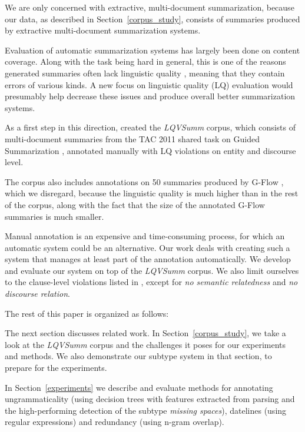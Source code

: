 \documentclass[a4paper,10pt]{scrartcl}
\theoremstyle{style}
\begin{document}
We are only concerned with extractive, multi-document summarization, because our data, as described in Section~\ref{corpus_study}, consists of summaries produced by extractive multi-document summarization systems.

Evaluation of automatic summarization systems has largely been done on content coverage. Along with the task being hard in general, this is one of the reasons generated summaries often lack linguistic quality \citep{nenkova2011foundations}, meaning that they contain errors of various kinds. A new focus on linguistic quality (LQ) evaluation would presumably help decrease these issues and produce overall better summarization systems.

As a first step in this direction, \cite{friedrichlqvsumm} created the \textit{LQVSumm} corpus, which consists of multi-document summaries from the TAC 2011 shared task on Guided Summarization \citep{owczarzak2011overview}, annotated manually with LQ violations on entity and discourse level.

The corpus also includes annotations on 50 summaries produced by G-Flow \citep{gflow}, which we disregard, because the linguistic quality is much higher than in the rest of the corpus, along with the fact that the size of the annotated G-Flow summaries is much smaller.

Manual annotation is an expensive and time-consuming process, for which an automatic system could be an alternative. Our work deals with creating such a system that manages at least part of the annotation automatically. We develop and evaluate our system on top of the \textit{LQVSumm} corpus. We also limit ourselves to the clause-level violations listed in \cite{friedrichlqvsumm}, except for \textit{no semantic relatedness} and \textit{no discourse relation}.

The rest of this paper is organized as follows:

The next section discusses related work. In Section~\ref{corpus_study}, we take a look at the \textit{LQVSumm} corpus and the challenges it poses for our experiments and methods. We also demonstrate our subtype system in that section, to prepare for the experiments.

In Section~\ref{experiments} we describe and evaluate methods for annotating ungrammaticality (using decision trees with features extracted from parsing and the high-performing detection of the subtype \textit{missing spaces}), datelines (using regular expressions) and redundancy (using n-gram overlap).
\end{document}
